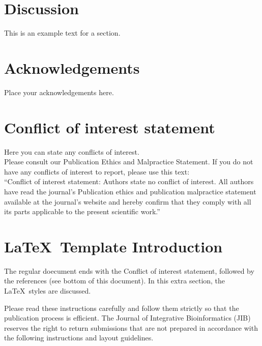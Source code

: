 \documentclass{jib}
\begin{document}
%
%
\section{Discussion}

This is an example text for a section.


%
%
\section*{Acknowledgements}
%
Place your acknowledgements here.
%


%
%
\section*{Conflict of interest statement}
%
Here you can state any conflicts of interest.
\\
Please consult our Publication Ethics and Malpractice Statement. If you do not
have any conflicts of interest to report, please use this text:
\\
``Conflict of interest statement: Authors state no conflict of interest. All
authors have read the journal's Publication ethics and publication malpractice
statement available at the journal's website and hereby confirm that they comply
with all its parts applicable to the present scientific work.''


%
%
\section{\LaTeX\ Template Introduction}

The regular doecument ends with the Conflict of interest statement, followed by
the references (see bottom of this document). In this extra section, the \LaTeX\
 styles are discussed.

Please read these instructions carefully and follow them strictly so that the
publication process is efficient. The Journal of Integrative Bioinformatics
(JIB) reserves the right to return submissions that are not prepared in
accordance with the following instructions and layout guidelines.
\end{document}
